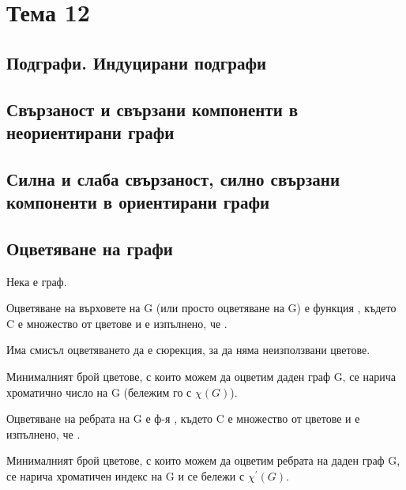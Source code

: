 \section{Тема 12}

\subsection{Подграфи. Индуцирани подграфи}

\subsection{Свързаност и свързани компоненти в неориентирани графи}

\subsection{Силна и слаба свързаност, силно свързани компоненти в ориентирани графи}

\subsection{Оцветяване на графи}
Нека \graf е граф.

\begin{definition}
    Оцветяване на върховете на G (или просто оцветяване на G) е функция , където 
    C е множество от цветове и е изпълнено, че .
\end{definition}

\begin{note}
    Има смисъл оцветяването да е сюрекция, за да няма неизползвани цветове.
\end{note}

\begin{definition}
    Минималният брой цветове, с които можем да оцветим даден граф G, се нарича хроматично число на G 
    (бележим го с \(\chi(G)\)).
\end{definition}

\begin{definition}
    Оцветяване на ребрата на G е ф-я , където C е множество от цветове и е изпълнено, че 
    .
\end{definition}

\begin{definition}
    Минималният брой цветове, с които можем да оцветим ребрата на даден граф G, се нарича хроматичен 
    индекс на G и се бележи с \(\chi^{'}(G)\).
\end{definition}

